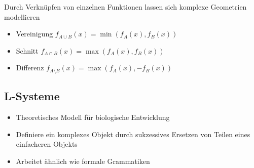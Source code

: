 Durch Verknüpfen von einzelnen Funktionen lassen sich komplexe Geometrien modellieren
\begin{itemize}
        \item Vereinigung $f_{A \cup B} (x) = \min (f_A(x), f_B(x))$
        \item Schnitt $f_{A \cap B} (x) = \max (f_A(x), f_B(x))$
        \item Differenz $f_{A \setminus B} (x) = \max (f_A(x), - f_B(x))$
\end{itemize}

\subsection{L-Systeme}%
\label{pm:sub:l_systeme}
\begin{itemize}
    \item Theoretisches Modell für biologische Entwicklung
    \item Definiere ein komplexes Objekt durch sukzessives Ersetzen von Teilen eines einfacheren Objekts
    \item Arbeitet ähnlich wie formale Grammatiken
\end{itemize}